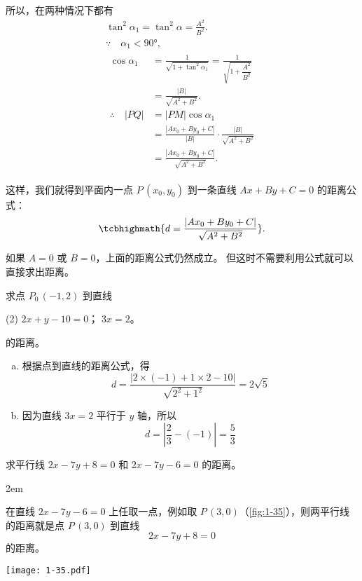 所以，在两种情况下都有
\begin{gather*}
\tan^2\alpha_1=\tan^2\alpha=\frac{A^2}{B^2}.\\
\because \quad \alpha_1< \ang{90},\\
\begin{split}
  \cos\alpha_1&=\frac{1}{\sqrt{1+\tan^2\alpha_1}}=\frac{1}{\sqrt{1+\dfrac{A^2}{B^2}}}\\
   &=\frac{\left| B\right| }{\sqrt{{A}^{2} + {B}^{2}}}.\\
  \therefore\quad |PQ|&=|PM|\cos\alpha_1\\
   &=\frac{|Ax_0+By_0+C|}{|B|} \cdot \frac{|B|}{\sqrt{A^2+B^2}}\\
   &=\frac{|Ax_0+By_0+C|}{\sqrt{A^2+B^2}}.
\end{split}
\end{gather*}

这样，我们就得到平面内一点 $P\,(x_0,y_0)$ 到一条直线 $Ax+By+C=0$ 的距离公式：
\[ \tcbhighmath{d = \frac{|Ax_0+By_0+C|}{\sqrt{A^2+B^2}}}. \]

如果 $A=0$ 或 $B=0$，上面的距离公式仍然成立。
但这时不需要利用公式就可以直接求出距离。

\begin{example}
  求点 $P_0\,(-1,2)$ 到直线 
  \begin{tasks}(2)
    \task $2x+y-10=0$；
    \task $3x=2$。
  \end{tasks}
  的距离。
\end{example}
\begin{solution}
  \begin{enumerate}[a)]
    \item 根据点到直线的距离公式，得
    \[ d=\frac{|2\times(-1)+1\times2-10|}{\sqrt{2^2+1^2}}=2\sqrt{5}\]
    \item 因为直线 $3x=2$ 平行于 $y$ 轴，所以
    \[d=\left|\frac{2}{3}-(-1)\right|=\frac{5}{3}\]
  \end{enumerate}
\end{solution}

\begin{example}
  求平行线 $2x-7y+8=0$ 和 $2x-7y-6=0$ 的距离。
\end{example}

\noindent
\begin{minipage}{0.55\linewidth}\parindent2em
\begin{solution}
  在直线 $2x-7y-6=0$ 上任取一点，例如取 $P\,(3,0)$（\cref{fig:1-35}），则两平行线的距离就是点 $P\,(3,0)$ 到直线 
  \[2x-7y+8=0\]
  的距离。
\end{solution}
\end{minipage}\hfill
\begin{minipage}{0.4\linewidth}\centering
\begin{figurehere}
  \texttt{[image: 1-35.pdf]}
  \caption{}\label{fig:1-35}
\end{figurehere}
\end{minipage}

